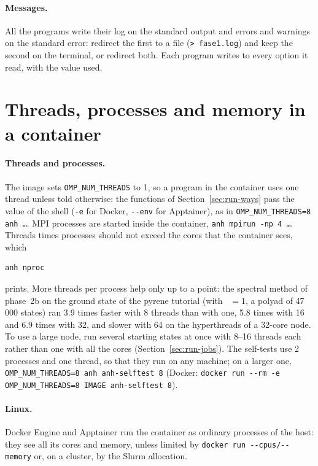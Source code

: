 \paragraph{Messages.} All the programs write their log on the standard
output and errors and warnings on the standard error: redirect the first
to a file (\texttt{> fase1.log}) and keep the second on the terminal, or
redirect both. Each program writes to  every option it read,
with the value used.

\section{Threads, processes and memory in a container}\label{sec:run-resources}

\paragraph{Threads and processes.} The image sets
\texttt{OMP\_NUM\_THREADS} to 1, so a program in the container uses one
thread unless told otherwise: the functions  of
Section~\ref{sec:run-ways} pass the value of the shell
(\texttt{-e} for Docker, \texttt{-{}-env} for Apptainer), as in
\texttt{OMP\_NUM\_THREADS=8 anh \ldots}. MPI processes are started inside
the container, \texttt{anh mpirun -np 4 \ldots}. Threads times processes
should not exceed the cores that the container sees, which
\begin{lstlisting}
anh nproc
\end{lstlisting}
prints. More threads per process help only up to a point: the spectral
method of phase~2b on the ground state of the pyrene tutorial (with ~$=1$, a polyad of 47\,000 states) ran 3.9 times faster with 8
threads than with one, 5.8 times with 16 and 6.9 times with 32, and
slower with 64 on the hyperthreads of a 32-core node. To use a large
node, run several starting states at once with 8--16 threads each
rather than one with all the cores (Section~\ref{sec:run-jobs}). The self-tests use 2 processes and one thread, so that they run on
any machine; on a larger one, \texttt{OMP\_NUM\_THREADS=8 anh anh-selftest
8} (Docker: \texttt{docker run -{}-rm -e OMP\_NUM\_THREADS=8 IMAGE
anh-selftest 8}).

\paragraph{Linux.} Docker Engine and Apptainer run the container as
ordinary processes of the host: they see all its cores and memory, unless
limited by \texttt{docker run -{}-cpus/-{}-memory} or, on a cluster, by the
Slurm allocation.

